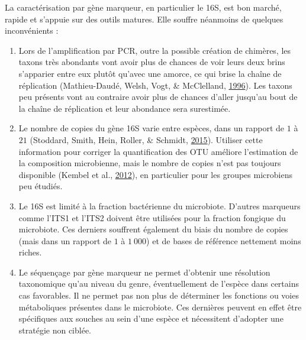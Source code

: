 \documentclass[12pt,a4paper]{reedthesis}
\theoremstyle{definition}
\theoremstyle{definition}
\theoremstyle{definition}
\theoremstyle{remark}
\begin{document}
La caractérisation par gène marqueur, en particulier le 16S, est bon marché, rapide et s'appuie sur des outils matures. Elle souffre néanmoins de quelques inconvénients :
\begin{enumerate}
\def\labelenumi{\arabic{enumi}.}
\item
  Lors de l'amplification par PCR, outre la possible création de chimères, les taxons très abondants vont avoir plus de chances de voir leurs deux brins s'apparier entre eux plutôt qu'avec une amorce, ce qui brise la chaîne de réplication (Mathieu-Daudé, Welsh, Vogt, \& McClelland, \protect\hyperlink{ref-mathieu1996dna}{1996}). Les taxons peu présents vont au contraire avoir plus de chances d'aller jusqu'au bout de la chaîne de réplication et leur abondance sera surestimée.
\item
  Le nombre de copies du gène 16S varie entre espèces, dans un rapport de \(1\) à \(21\) (Stoddard, Smith, Hein, Roller, \& Schmidt, \protect\hyperlink{ref-stoddard2015rrn}{2015}). Utiliser cette information pour corriger la quantification des OTU améliore l'estimation de la composition microbienne, mais le nombre de copies n'est pas toujours disponible (Kembel et al., \protect\hyperlink{ref-kembel2012incorporating}{2012}), en particulier pour les groupes microbiens peu étudiés.
\item
  Le 16S est limité à la fraction bactérienne du microbiote. D'autres marqueurs comme l'ITS1 et l'ITS2 doivent être utilisées pour la fraction fongique du microbiote. Ces derniers souffrent également du biais du nombre de copies (mais dans un rapport de \(1\) à \(1~000\)) et de bases de référence nettement moins riches.
\item
  Le séquençage par gène marqueur ne permet d'obtenir une résolution taxonomique qu'au niveau du genre, éventuellement de l'espèce dans certains cas favorables. Il ne permet pas non plus de déterminer les fonctions ou voies métaboliques présentes dans le microbiote. Ces dernières peuvent en effet être spécifiques aux souches au sein d'une espèce et nécessitent d'adopter une stratégie non ciblée.
\end{enumerate}
\end{document}
